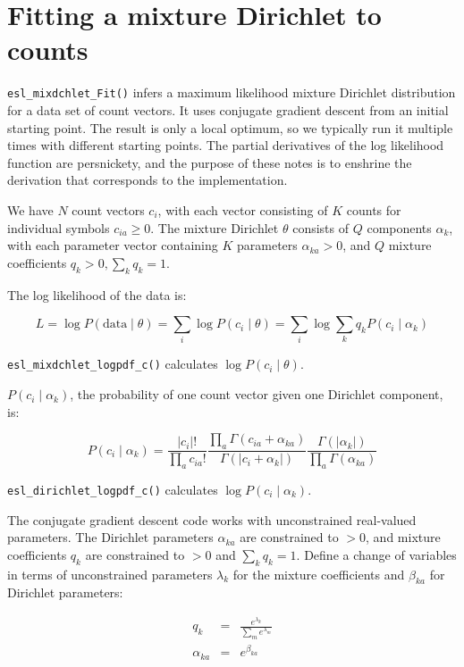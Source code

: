 \documentclass[11pt]{article}
\newcommand{\mono}[1]{{\smaller\texttt{#1}}}                    %
\begin{document}
\section{Fitting a mixture Dirichlet to counts}

\mono{esl\_mixdchlet\_Fit()} infers a maximum likelihood mixture
Dirichlet distribution for a data set of count vectors. It uses
conjugate gradient descent from an initial starting point. The result
is only a local optimum, so we typically run it multiple times with
different starting points. The partial derivatives of the log
likelihood function are persnickety, and the purpose of these notes is
to enshrine the derivation that corresponds to the implementation.

We have $N$ count vectors $c_i$, with each vector consisting of $K$
counts for individual symbols $c_{ia} \geq 0$. The mixture Dirichlet
$\theta$ consists of $Q$ components $\alpha_k$, with each parameter
vector containing $K$ parameters $\alpha_{ka} > 0$, and $Q$ mixture
coefficients $q_k > 0, \sum_k q_k = 1$.

The log likelihood of the data is:

\[
  L = \log P(\mbox{data} \mid \theta) = \sum_i \log P(c_i \mid \theta) = \sum_i \log \sum_k q_k P(c_i \mid \alpha_k)
\]

\mono{esl\_mixdchlet\_logpdf\_c()} calculates $\log P(c_i \mid
\theta)$.

$P(c_i \mid \alpha_k)$, the probability of one count vector given one
Dirichlet component, is:

\[
P(c_i \mid \alpha_k) = \frac{ |c_i|! }
                            { \prod_a c_{ia}! }
                       \frac{ \prod_a \Gamma \left( c_{ia} + \alpha_{ka} \right) }
                            { \Gamma ( |c_i + \alpha_k| ) }
                       \frac{ \Gamma ( |\alpha_k| ) }
                            { \prod_a \Gamma \left( \alpha_{ka} \right) }
\]

\mono{esl\_dirichlet\_logpdf\_c()} calculates $\log P(c_i \mid \alpha_k)$.

The conjugate gradient descent code works with unconstrained
real-valued parameters. The Dirichlet parameters $\alpha_{ka}$ are
constrained to $>0$, and mixture coefficients $q_k$ are constrained to
$>0$ and $\sum_k q_k = 1$. Define a change of variables in terms of
unconstrained parameters $\lambda_k$ for the mixture coefficients and
$\beta_{ka}$ for Dirichlet parameters:

\begin{eqnarray*}
  q_k          & = & \frac{ e^{\lambda_k} } { \sum_m e^{\lambda_m} } \\
  \alpha_{ka}  & = & e^{\beta_{ka}} 
\end{eqnarray*}
\end{document}
